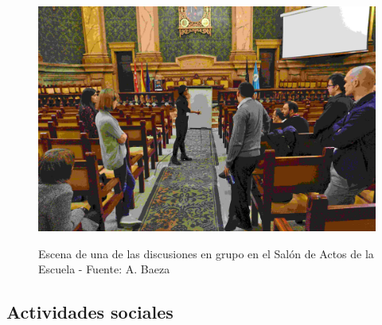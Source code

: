 \documentclass[twoside]{article}
\begin{document}
\begin{center}
\begin{figure}
	\centering
		\includegraphics[width=.95\textwidth]{GroupDiscussion}
	\label{fig:Discussion}
	\caption{Escena de una de las discusiones en grupo en el Salón de Actos de la Escuela - Fuente: A. Baeza}
\end{figure}
\end{center}


\subsection{Actividades sociales}
\end{document}
